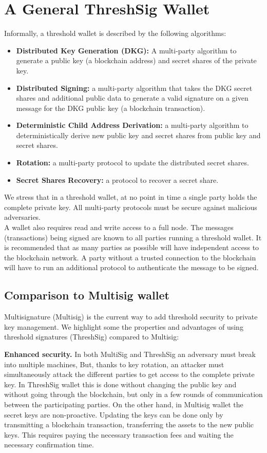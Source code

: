 \documentclass[runningheads]{llncs}
\begin{document}
\section{A General ThreshSig Wallet} 
Informally, a threshold wallet is described by the following algorithms: 
\begin{itemize}
    \item \textbf{Distributed Key Generation (DKG):} A multi-party algorithm to generate a public key (a blockchain address) and secret shares of the private key. 
    \item \textbf{Distributed Signing:} a multi-party algorithm that takes the DKG secret shares and additional public data to generate a valid signature on a given message for the DKG public key (a blockchain transaction).
    \item \textbf{Deterministic Child Address Derivation:} a multi-party algorithm to deterministically derive new public key and secret shares from public key and secret shares. 
    \item \textbf{Rotation:} a multi-party protocol to update the distributed secret shares.
    \item \textbf{Secret Shares Recovery:} a protocol to recover a secret share. 
\end{itemize}
We stress that in a threshold wallet, at no point in time a single party holds the complete private key. All multi-party protocols must be secure against malicious adversaries. \\
A wallet also requires read and write access to a full node. The messages (transactions) being signed are known to all parties running a threshold wallet. It is recommended that as many parties as possible will have independent access to the blockchain network. A party without a trusted connection to the blockchain will have to run an additional protocol to authenticate the message to be signed.  
\subsection{Comparison to Multisig wallet}
Multisignature (Multisig) is the current way to add threshold security to private key management. We highlight some the properties and advantages of using threshold signatures (ThreshSig) compared to Multisig:

\textbf{Enhanced security.} In both MultiSig and ThreshSig an adversary must break into multiple machines, But, thanks to key rotation, an attacker must simultaneously attack the different parties to get access to the complete private key. In ThreshSig wallet this is done without changing the public key and without going through the blockchain, but only in a few rounds of communication between the participating parties. On the other hand, in Multisig wallet the secret keys are non-proactive. Updating the keys can be done only by transmitting a blockchain transaction, transferring the assets to the new public keys. This requires paying the necessary transaction fees and waiting the necessary confirmation time.\\
\end{document}
